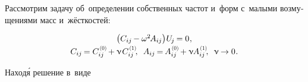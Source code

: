 \begin{otherlanguage}{russian}

Рассмотрим задачу об~определении собственных частот и~форм с~малыми возмущениями масс и~жёсткостей:

\nopagebreak\vspace{-0.1em}\begin{equation}\begin{array}{c}
\bigl( C_{ij} \hspace{-0.15ex} - \omega^2 \hspace{-0.2ex} A_{ij} \bigr) \hspace{.1ex} U_{\hspace{-0.2ex}j} \hspace{-0.15ex} = 0 \hspace{.1ex} ,
\\[.2em]
%
C_{ij} \hspace{-0.2ex} = C_{ij}^{\hspace{.2ex}\scalebox{0.66}[0.66]{(0)}} \hspace{-0.2ex} + \smallparameter \hspace{.2ex} C_{ij}^{\hspace{.2ex}\scalebox{0.66}[0.66]{(1)}} \hspace{-0.4ex} ,
\;\:
A_{ij} \hspace{-0.2ex} = \hspace{-0.2ex} A_{ij}^{\hspace{.2ex}\scalebox{0.66}[0.66]{(0)}} \hspace{-0.2ex} + \smallparameter \hspace{-0.1ex} A_{ij}^{\hspace{.2ex}\scalebox{0.66}[0.66]{(1)}} \hspace{-0.4ex} ,
\;\:
\smallparameter \hspace{-0.12ex} \to 0 \hspace{.1ex} .
\end{array}\end{equation}

\vspace{-0.2em} \noindent Наход\'{я} решение в~виде


\end{otherlanguage}
